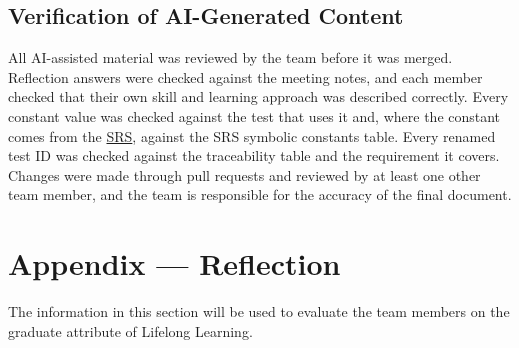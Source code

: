 \documentclass[12pt, titlepage]{article}
\begin{document}
\subsection{Verification of AI-Generated Content}

All AI-assisted material was reviewed by the team before it was merged.
Reflection answers were checked against the meeting notes, and each member
checked that their own skill and learning approach was described correctly.
Every constant value was checked against the test that uses it and, where the
constant comes from the \href{https://github.com/arjunkarthik123/fitness-finance-application/blob/main/pdfs/SRS-Volere/SRS.pdf}{SRS}, against the SRS symbolic constants table. Every
renamed test ID was checked against the traceability table and the
requirement it covers. Changes were made through pull requests and reviewed by
at least one other team member, and the team is responsible for the accuracy of
the final document.

\newpage{}

\section{Appendix --- Reflection}

The information in this section will be used to evaluate the team members on the
graduate attribute of Lifelong Learning.


\end{document}
